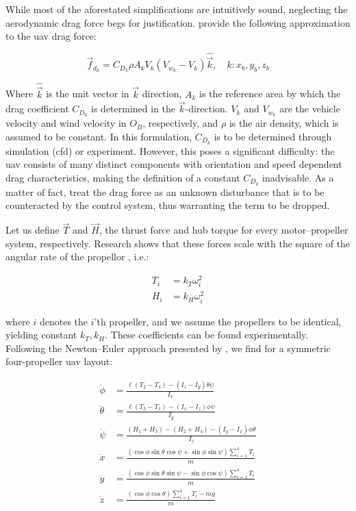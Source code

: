 While most of the aforestated simplifications are intuitively sound, neglecting the aerodynamic drag force begs for justification. \citet{Castillo2017} provide the following approximation to the \gls{uav} drag force:

\begin{equation}
	\vec{f}_{d_k} = C_{D_k} \rho A_k V_k (V_{w_k} - V_k) \hat{\vec{k}}, \quad k: x_b, y_b, z_b 
\end{equation} 

Where $\hat{\vec{k}}$ is the unit vector in $\vec{k}$ direction, $A_k$ is the reference area by which the drag coefficient $C_{D_k}$ is determined in the $\vec{k}$-direction. $V_k$ and $V_{w_k}$ are the vehicle velocity and wind velocity in $O_B$, respectively, and $\rho$ is the air density, which is assumed to be constant. In this formulation, $C_{D_k}$ is to be determined through simulation (\gls{cfd}) or experiment. However, this poses a significant difficulty: the \gls{uav} consists of many distinct components with orientation and speed dependent drag characteristics, making the definition of a constant $C_{D_k}$ inadvisable. As a matter of fact, \citet{Castillo2017} treat the drag force as an unknown disturbance that is to be counteracted by the control system, thus warranting the term to be dropped.

Let us define $\vec{T}$ and $\vec{H}$, the thrust force and hub torque for every motor--propeller system, respectively. Research shows that these forces scale with the square of the angular rate of the propellor \citep{Kurak2018, Castillo2017, Winslow2018, Bershadsky2016, Luukkonen2011}, i.e.:

\begin{align}
	T_i &= k_T \omega_i^2 \\
	H_i &= k_H \omega_i^2
\end{align}

where $i$ denotes the $i$'th propeller, and we assume the propellers to be identical, yielding constant $k_T, k_H$. These coefficients can be found experimentally. Following the Newton--Euler approach presented by \citet{Kurak2018}, we find for a symmetric four-propeller \gls{uav} layout:

\begin{align}
	\ddot\phi &= \frac{\ell (T_2 - T_4) - (I_z - I_y) \dot\theta \dot\psi}{I_x} \\
	\ddot\theta &= \frac{\ell (T_3 - T_1) - (I_x - I_z) \dot\phi \dot\psi}{I_y} \\
	\ddot\psi &= \frac{(H_1 + H_3) - (H_2 + H_4) - (I_y - I_x)\dot\phi \dot\theta}{I_z} \\
	\ddot x &= \frac{(\cos\phi \sin\theta \cos\psi + \sin\phi \sin\psi) \sum_{i=1}^{4} T_i}{m} \\
	\ddot y &= \frac{(\cos\phi \sin\theta \sin\psi - \sin\phi \cos\psi) \sum_{i=1}^{4} T_i}{m} \\
	\ddot z &= \frac{(\cos\phi \cos\theta) \sum_{i=1}^{4} T_i - m g}{m}
\end{align}

